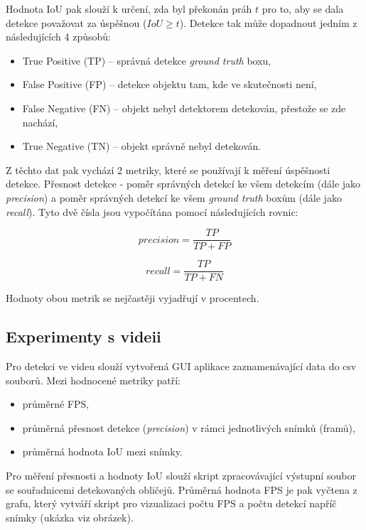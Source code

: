 Hodnota IoU pak slouží k určení, zda byl překonán práh $t$ pro to, aby se dala detekce považovat za úspěšnou ($IoU \ge t$). Detekce tak může dopadnout jedním z následujících 4 způsobů:

\begin{itemize}
  \item True Positive (TP) -- správná detekce \emph{ground truth} boxu,
  \item False Positive (FP) -- detekce objektu tam, kde ve skutečnosti není,
  \item False Negative (FN) -- objekt nebyl detektorem detekován, přestože se zde nachází,
  \item True Negative (TN) -- objekt správně nebyl detekován.
\end{itemize}

Z těchto dat pak vychází 2 metriky, které se používají k měření úspěšnosti detekce. Přesnost detekce - poměr správných detekcí ke všem detekcím (dále jako \emph{precision}) a poměr správných detekcí ke všem \emph{ground truth} boxům (dále jako \emph{recall}). Tyto dvě čísla jsou vypočítána pomocí následujících rovnic:

\begin{equation}
  precision = \frac{TP}{TP + FP}
\end{equation}

\begin{equation}
  recall = \frac{TP}{TP + FN}
\end{equation}

\noindent Hodnoty obou metrik se nejčastěji vyjadřují v procentech.


\subsection*{Experimenty s videii}
Pro detekci ve videu slouží vytvořená GUI aplikace zaznamenávající data do csv souborů. Mezi hodnocené metriky patří:

\begin{itemize}
  \item průměrné FPS,
  \item průměrná přesnost detekce (\emph{precision}) v rámci jednotlivých snímků (framů),
  \item průměrná hodnota IoU mezi snímky.
\end{itemize}

Pro měření přesnosti a hodnoty IoU slouží skript zpracovávající výstupní soubor se souřadnicemi detekovaných obličejů. Průměrná hodnota FPS je pak vyčtena z grafu, který vytváří skript pro vizualizaci počtu FPS a počtu detekcí napříč snímky (ukázka viz obrázek). %

